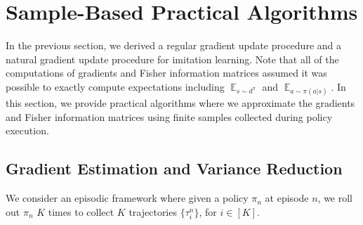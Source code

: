 \documentclass{article}
\begin{document}
\section{Sample-Based Practical Algorithms}
In the previous section, we derived a regular gradient update procedure and a natural gradient update procedure for imitation learning. Note that all of the computations of gradients and Fisher information matrices assumed it was possible to exactly compute expectations including $\mathop{\mathbb{E}}_{s\sim d^{\pi}}$ and $\mathop{\mathbb{E}}_{a\sim \pi(a|s)}$. In this section, we provide practical algorithms where we approximate the gradients and Fisher information matrices using finite samples collected during policy execution. 

\subsection{Gradient Estimation and Variance Reduction}
We consider an episodic framework where given a policy $\pi_n$ at episode $n$, we roll out $\pi_n$ $K$ times to collect $K$ trajectories $\{\tau_i^{n}\}$, for $i\in [K]$. 
\end{document}
